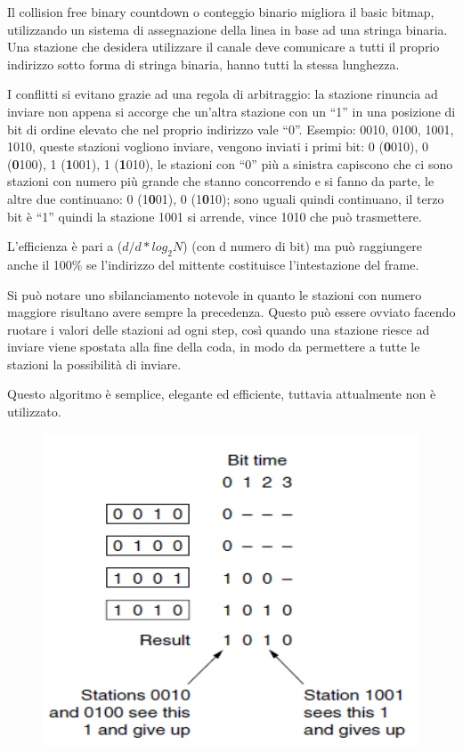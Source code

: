 Il collision free binary countdown o conteggio binario migliora il basic bitmap, utilizzando un sistema di assegnazione della linea in base ad una stringa binaria.
Una stazione che desidera utilizzare il canale deve comunicare a tutti il proprio indirizzo sotto forma di stringa binaria, hanno tutti la stessa lunghezza.

I conflitti si evitano grazie ad una regola di arbitraggio: la stazione rinuncia ad inviare non appena si accorge che un’altra stazione con un “1” in una posizione di bit di ordine elevato che nel proprio indirizzo vale “0”.
Esempio: 0010, 0100, 1001, 1010, queste stazioni vogliono inviare, vengono inviati i primi bit: 0 (\textbf{0}010), 0 (\textbf{0}100), 1 (\textbf{1}001), 1 (\textbf{1}010), le stazioni con “0” più a sinistra capiscono che ci sono stazioni con numero più grande che stanno concorrendo e si fanno da parte, le altre due continuano: 0 (1\textbf{0}01), 0 (1\textbf{0}10); sono uguali quindi continuano, il terzo bit è “1” quindi la stazione 1001 si arrende, vince 1010 che può trasmettere.

L’efficienza è pari a ($d/d*log_2N$) (con d numero di bit) ma può raggiungere anche il 100\% se l’indirizzo del mittente costituisce l’intestazione del frame.

Si può notare uno sbilanciamento notevole in quanto le stazioni con numero maggiore risultano avere sempre la precedenza. Questo può essere ovviato facendo ruotare i valori delle stazioni ad ogni step, così quando una stazione riesce ad inviare viene spostata alla fine della coda, in modo da permettere a tutte le stazioni la possibilità di inviare.

Questo algoritmo è semplice, elegante ed efficiente, tuttavia attualmente non è utilizzato.

\begin{figure}[H]
\centering
\includegraphics[scale=0.6]{res/img/25_FreeBinaryCountdown.png}
\end{figure} 


